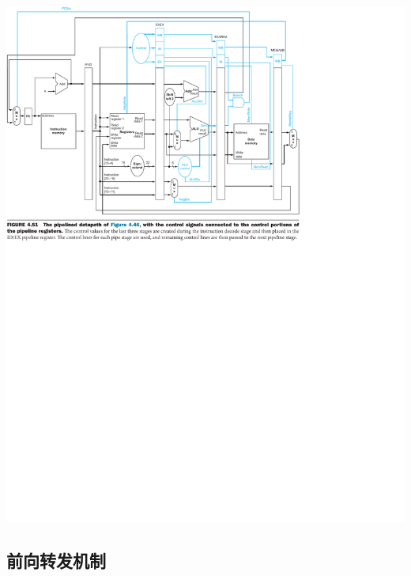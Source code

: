 \documentclass[a4paper,UTF8]{ctexart}
\begin{document}
\includegraphics[width=\textwidth]{pipeline.pdf}

\subsection{前向转发机制}
\end{document}
